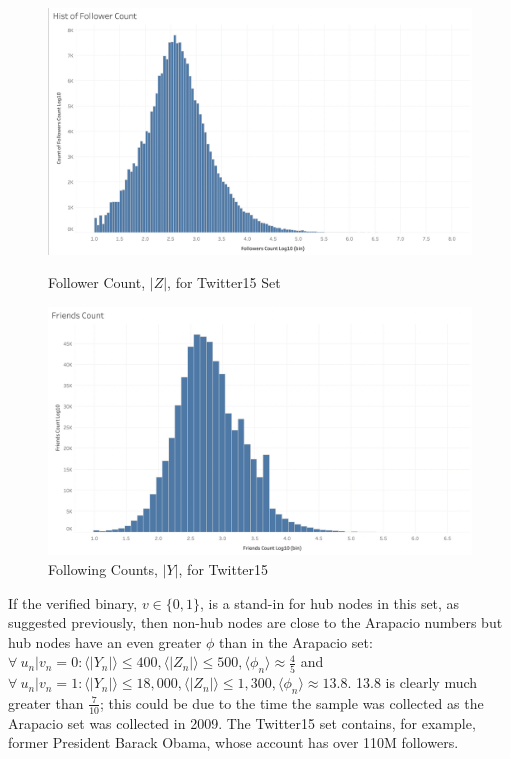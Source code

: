 \documentclass[NETN,manuscript]{stjour-new}
\begin{document}
 \begin{figure}[h]
  \includegraphics[width=\linewidth]{Twitter15 Follower Count.png}
  \caption{Follower Count, $|Z|$, for Twitter15 Set}\label{fig:Twitter15 Follower}
\endminipage\hfill
{}
  \includegraphics[width=\linewidth]{Twitter15 FriendsCount.png}
  \caption{Following Counts, $|Y|$, for Twitter15}\label{fig:Twitter15 Following}
\endminipage\hfill
\end{figure}



If the verified binary, $v \in \{0,1\}$, is a stand-in for hub nodes in this set, as suggested previously, then non-hub nodes are close to the Arapacio numbers but hub nodes have an even greater $\phi$ than in the Arapacio set: $\forall \ u_n| v_n = 0:\langle |Y_n| \rangle \leq 400, \langle |Z_n| \rangle \leq 500, \langle  \phi_n \rangle \approx \frac{4}{5}$ and $\forall \ u_n| v_n = 1:\langle |Y_n| \rangle \leq 18,000, \langle |Z_n| \rangle \leq 1,300, \langle  \phi_n \rangle \approx 13.8$. 13.8 is clearly much greater than $\frac{7}{10}$; this could be due to the time the sample was collected as the Arapacio set was collected in 2009. The Twitter15 set contains, for example, former President Barack Obama, whose account has over 110M followers. 
\end{document}
